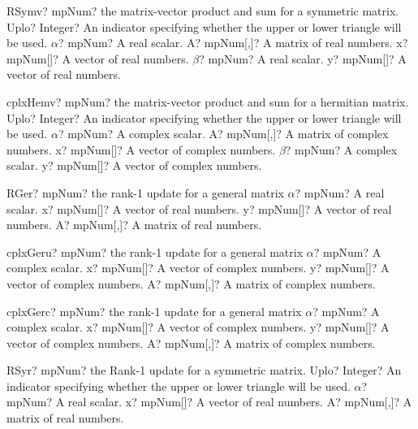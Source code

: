 \documentclass[12pt,a4paper,openany]{book}
\begin{document}
\begin{mpFunctionsExtract}
\mpFunctionSix
{RSymv? mpNum? the matrix-vector product and sum for a symmetric matrix.}
{Uplo? Integer? An indicator specifying whether the upper or lower triangle will be used.}
{$\alpha$? mpNum? A real scalar.}
{A? mpNum[,]? A matrix of real numbers.}
{x? mpNum[]? A vector of real numbers.}
{$\beta$? mpNum? A real scalar.}
{y? mpNum[]? A vector of real numbers.}
\end{mpFunctionsExtract}

\begin{mpFunctionsExtract}
\mpFunctionSix
{cplxHemv? mpNum? the matrix-vector product and sum for a hermitian matrix.}
{Uplo? Integer? An indicator specifying whether the upper or lower triangle will be used.}
{$\alpha$? mpNum? A complex scalar.}
{A? mpNum[,]? A matrix of complex numbers.}
{x? mpNum[]? A vector of complex numbers.}
{$\beta$? mpNum? A complex scalar.}
{y? mpNum[]? A vector of complex numbers.}
\end{mpFunctionsExtract}

\begin{mpFunctionsExtract}
\mpFunctionFour
{RGer? mpNum? the rank-1 update for a general matrix}
{$\alpha$? mpNum? A real scalar.}
{x? mpNum[]? A vector of real numbers.}
{y? mpNum[]? A vector of real numbers.}
{A? mpNum[,]? A matrix of real numbers.}
\end{mpFunctionsExtract}

\begin{mpFunctionsExtract}
\mpFunctionFour
{cplxGeru? mpNum? the rank-1 update for a general matrix}
{$\alpha$? mpNum? A complex scalar.}
{x? mpNum[]? A vector of complex numbers.}
{y? mpNum[]? A vector of complex numbers.}
{A? mpNum[,]? A matrix of complex numbers.}
\end{mpFunctionsExtract}

\begin{mpFunctionsExtract}
\mpFunctionFour
{cplxGerc? mpNum? the rank-1 update for a general matrix}
{$\alpha$? mpNum? A complex scalar.}
{x? mpNum[]? A vector of complex numbers.}
{y? mpNum[]? A vector of complex numbers.}
{A? mpNum[,]? A matrix of complex numbers.}
\end{mpFunctionsExtract}

\begin{mpFunctionsExtract}
\mpFunctionFour
{RSyr? mpNum? the Rank-1 update for a symmetric matrix.}
{Uplo? Integer? An indicator specifying whether the upper or lower triangle will be used.}
{$\alpha$? mpNum? A real scalar.}
{x? mpNum[]? A vector of real numbers.}
{A? mpNum[,]? A matrix of real numbers.}
\end{mpFunctionsExtract}
\end{document}
